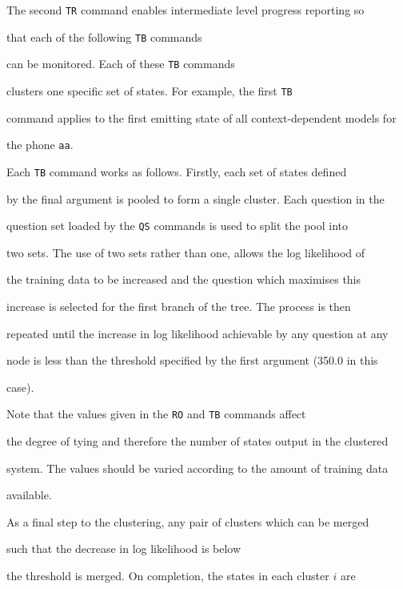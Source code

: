 The second \texttt{TR} command enables intermediate level progress reporting so


that each of the following \texttt{TB} commands


can be monitored.  Each of these \texttt{TB} commands


clusters one specific set of states.  For example, the first \texttt{TB}


command applies to the first emitting state of all context-dependent models for


the phone \texttt{aa}.





Each \texttt{TB} command works as follows.  Firstly, each set of states defined


by the final argument is pooled to form a single cluster.  Each question in the


question set loaded by the \texttt{QS} commands is used to split the pool into


two sets.  The use of two sets rather than one, allows the log likelihood of


the training data to be increased and the question which maximises this


increase is selected for the first branch of the tree. The process is then


repeated until the increase in log likelihood achievable by any question at any


node is less than the threshold specified by the first argument (350.0 in this


case).





Note that the values given in the \texttt{RO} and \texttt{TB} commands affect


the degree of tying and therefore the number of states output in the clustered


system.  The values should be varied according to the amount of training data


available.


As a final step to the clustering, any pair of clusters which can be merged


 such that the decrease in log likelihood is below


the threshold is merged.  On completion, the states in each cluster $i$ are


